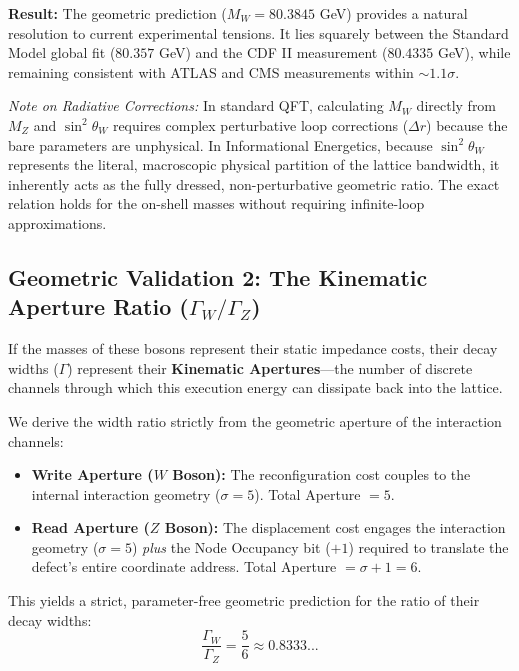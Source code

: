 \textbf{Result:} The geometric prediction ($M_W = 80.3845$ GeV) provides a natural resolution to current experimental tensions. It lies squarely between the Standard Model global fit ($80.357$ GeV) and the CDF II measurement ($80.4335$ GeV), while remaining consistent with ATLAS and CMS measurements within $\sim 1.1\sigma$. 

\textit{Note on Radiative Corrections:} In standard QFT, calculating $M_W$ directly from $M_Z$ and $\sin^2\theta_W$ requires complex perturbative loop corrections ($\Delta r$) because the bare parameters are unphysical. In Informational Energetics, because $\sin^2\theta_W$ represents the literal, macroscopic physical partition of the lattice bandwidth, it inherently acts as the fully dressed, non-perturbative geometric ratio. The exact relation holds for the on-shell masses without requiring infinite-loop approximations. 

\subsection{Geometric Validation 2: The Kinematic Aperture Ratio (\texorpdfstring{$\Gamma_W / \Gamma_Z$}{Width Ratio})}

If the masses of these bosons represent their static impedance costs, their decay widths ($\Gamma$) represent their \textbf{Kinematic Apertures}---the number of discrete channels through which this execution energy can dissipate back into the lattice.

We derive the width ratio strictly from the geometric aperture of the interaction channels:
\begin{itemize}
    \item \textbf{Write Aperture ($W$ Boson):} The reconfiguration cost couples to the internal interaction geometry ($\sigma = 5$). Total Aperture $= 5$.
    \item \textbf{Read Aperture ($Z$ Boson):} The displacement cost engages the interaction geometry ($\sigma = 5$) \textit{plus} the Node Occupancy bit ($+1$) required to translate the defect's entire coordinate address. Total Aperture $= \sigma + 1 = 6$.
\end{itemize}

This yields a strict, parameter-free geometric prediction for the ratio of their decay widths:
\begin{equation}
    \frac{\Gamma_W}{\Gamma_Z} = \frac{5}{6} \approx \mathbf{0.8333...}
\end{equation}

